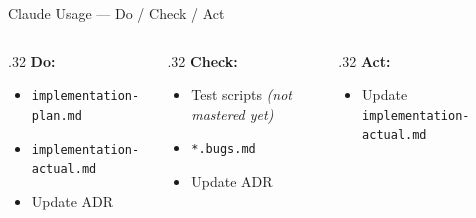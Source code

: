 \documentclass[xcolor,aspectratio=169,compress]{beamer}
\begin{document}
\begin{frame}{Claude Usage --- Do / Check / Act}
  \small
  \begin{columns}[t]
    \begin{column}{.32\textwidth}
      \textbf{Do:}
      \begin{itemize}\setlength{\itemsep}{4pt}
        \item {\footnotesize\texttt{implementation-plan.md}}
        \item {\footnotesize\texttt{implementation-actual.md}}
        \item Update ADR
      \end{itemize}
    \end{column}
    \begin{column}{.32\textwidth}
      \textbf{Check:}
      \begin{itemize}\setlength{\itemsep}{4pt}
        \item Test scripts {\footnotesize\textit{(not mastered yet)}}
        \item {\footnotesize\texttt{*.bugs.md}}
        \item Update ADR
      \end{itemize}
    \end{column}
    \begin{column}{.32\textwidth}
      \textbf{Act:}
      \begin{itemize}\setlength{\itemsep}{4pt}
        \item Update {\footnotesize\texttt{implementation-actual.md}}
      \end{itemize}
    \end{column}
  \end{columns}
\end{frame}
\end{document}
